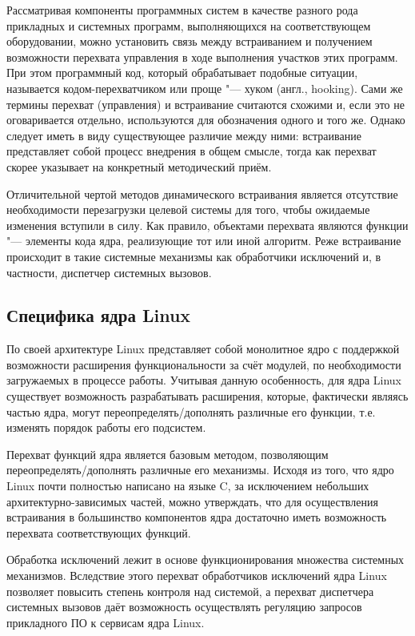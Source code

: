 \documentclass[10pt, a5paper]{article}
\begin{document}
Рассматривая компоненты программных систем в качестве разного рода прикладных и системных программ, выполняющихся на соответствующем оборудовании, можно установить связь между встраиванием и получением возможности перехвата управления в ходе выполнения участков этих программ. При этом программный код, который обрабатывает подобные ситуации, называется кодом-перехватчиком или проще "--- хуком (англ., hooking). Сами же термины перехват (управления) и встраивание считаются схожими и, если это не оговаривается отдельно, используются для обозначения одного и того же. Однако следует иметь в виду существующее различие между ними: встраивание представляет собой процесс внедрения в общем смысле, тогда как перехват скорее указывает на конкретный методический приём.

Отличительной чертой методов динамического встраивания является отсутствие необходимости перезагрузки целевой системы \linebreak для того, чтобы ожидаемые изменения вступили в силу. Как правило, объектами перехвата являются функции "--- элементы кода ядра, реализующие тот или иной алгоритм. Реже встраивание происходит в такие системные механизмы как обработчики исключений и, в частности, диспетчер системных вызовов.

\subsection*{Специфика ядра Linux}

По своей архитектуре Linux представляет собой монолитное ядро с поддержкой возможности расширения функциональности за счёт модулей, по необходимости загружаемых в процессе работы. Учитывая данную особенность, для ядра Linux существует возможность разрабатывать расширения, которые, фактически являясь частью ядра, могут переопределять/дополнять различные его функции, т.е.  изменять порядок работы его подсистем.

Перехват функций ядра является базовым методом, позволяющим переопределять/дополнять различные его механизмы. Исходя из того, что ядро Linux почти полностью написано на языке C, за исключением небольших архитектурно-зависимых частей, можно утверждать, что для осуществления встраивания в большинство компонентов ядра достаточно иметь возможность перехвата соответствующих функций.

Обработка исключений лежит в основе функционирования множества системных механизмов. Вследствие этого перехват обработчиков исключений ядра Linux позволяет повысить степень контроля над системой, а перехват диспетчера системных вызовов даёт возможность осуществлять регуляцию запросов прикладного ПО к сервисам ядра Linux.
\end{document}
